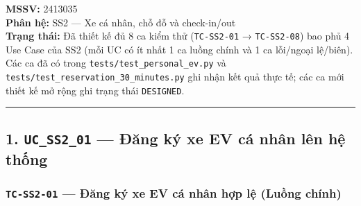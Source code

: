\documentclass[11pt,a4paper]{article}
\begin{document}
\textbf{MSSV:} 2413035\\
\textbf{Phân hệ:} SS2 --- Xe cá nhân, chỗ đỗ và check-in/out\\
\textbf{Trạng thái:} Đã thiết kế đủ 8 ca kiểm thử (\texttt{TC-SS2-01} →
\texttt{TC-SS2-08}) bao phủ 4 Use Case của SS2 (mỗi UC có ít nhất 1 ca
luồng chính và 1 ca lỗi/ngoại lệ/biên). Các ca đã có trong
\texttt{tests/test\_personal\_ev.py} và
\texttt{tests/test\_reservation\_30\_minutes.py} ghi nhận kết quả thực
tế; các ca mới thiết kế mở rộng ghi trạng thái \texttt{DESIGNED}.

\begin{center}\rule{0.5\linewidth}{0.5pt}\end{center}

\hypertarget{uc_ss2_01-ux111ux103ng-kuxfd-xe-ev-cuxe1-nhuxe2n-luxean-hux1ec7-thux1ed1ng}{%
\subsection{\texorpdfstring{1. \texttt{UC\_SS2\_01} --- Đăng ký xe EV cá
nhân lên hệ
thống}{1. UC\_SS2\_01 --- Đăng ký xe EV cá nhân lên hệ thống}}\label{uc_ss2_01-ux111ux103ng-kuxfd-xe-ev-cuxe1-nhuxe2n-luxean-hux1ec7-thux1ed1ng}}

\hypertarget{tc-ss2-01-ux111ux103ng-kuxfd-xe-ev-cuxe1-nhuxe2n-hux1ee3p-lux1ec7-luux1ed3ng-chuxednh}{%
\subsubsection{\texorpdfstring{\texttt{TC-SS2-01} --- Đăng ký xe EV cá
nhân hợp lệ (Luồng
chính)}{TC-SS2-01 --- Đăng ký xe EV cá nhân hợp lệ (Luồng chính)}}\label{tc-ss2-01-ux111ux103ng-kuxfd-xe-ev-cuxe1-nhuxe2n-hux1ee3p-lux1ec7-luux1ed3ng-chuxednh}}
\end{document}
